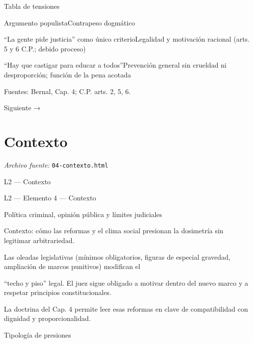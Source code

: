 \documentclass[11pt,a4paper]{article}
\begin{document}
      Tabla de tensiones\par



          Argumento populistaContrapeso dogmático\par




          “La gente pide justicia” como único criterioLegalidad y motivación racional (arts. 5 y 6 C.P.; debido proceso)\par

          “Hay que castigar para educar a todos”Prevención general sin crueldad ni desproporción; función de la pena acotada\par








      Fuentes: Bernal, Cap. 4; C.P. arts. 2, 5, 6.\par


    Siguiente →\par

\section{Contexto}
\noindent\textit{Archivo fuente:} \texttt{04-contexto.html}

L2 — Contexto\par





    L2 — Elemento 4 — Contexto\par
    Política criminal, opinión pública y límites judiciales\par

    Contexto: cómo las reformas y el clima social presionan la dosimetría sin legitimar arbitrariedad.\par


      Las oleadas legislativas (mínimos obligatorios, figuras de especial gravedad, ampliación de marcos punitivos) modifican el\par
      “techo y piso” legal. El juez sigue obligado a motivar dentro del nuevo marco y a respetar principios constitucionales.\par
      La doctrina del Cap. 4 permite leer esas reformas en clave de compatibilidad con dignidad y proporcionalidad.\par



      Tipología de presiones\par
\end{document}
